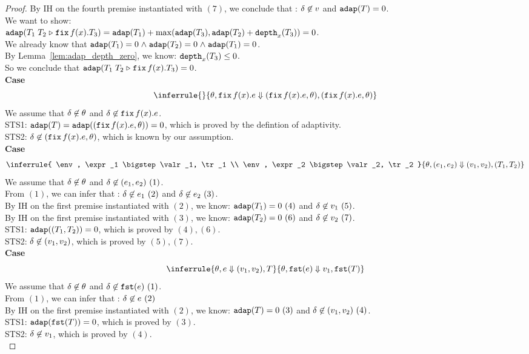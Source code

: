 \begin{proof}
By IH on the fourth premise instantiated with $(7)$, we conclude that
:
$\delta \not\in v $ and $\mathtt{adap}(T) = 0$. \\

We want to show: \\
 $ \mathtt{adap}(T_1 \; T_2 \mathrel{\triangleright} {\mathop{\mathtt{fix}} f(x).T_3})  = 
      \mathtt{adap}(T_1) + \max (\mathtt{adap}(T_3), \mathtt{adap}(T_2) +
      \mathtt{depth}_{x}(T_3)) = 0$. \\
We already know that $ \mathtt{adap}(T_1) =0 \mathrel{\wedge}\mathtt{adap}(T_2) =0  \mathrel{\wedge}
\mathtt{adap}(T_1) =0 $. \\
By Lemma~\ref{lem:adap_depth_zero}, we know: $\mathtt{depth}_{x}(T_3) \leq 0$.\\
So we conclude that $\mathtt{adap}(T_1 \; T_2 \mathrel{\triangleright} {\mathop{\mathtt{fix}} f(x).T_3}) =0$.\\
%
\textbf{Case}
\[\inferrule{
  }{
    \env, \efix f(x). \expr \bigstep (\efix f(x).\expr, \env),
    (\trfix f(x).\expr, \env)
  }\]
We assume that $\delta \not\in \theta$ and $\delta \not\in \mathop{\mathtt{fix}}
f(x). e$.\\
STS1: $\mathtt{adap}(T) = \mathtt{adap}( (\mathop{\mathtt{fix}} f(x).e, \theta) ) = 0$, which is
proved by the defintion of adaptivity. \\
STS2: $\delta \not\in (\mathop{\mathtt{fix}} f(x).e, \theta)$,  which is known by
our assumption. \\
%
\textbf{Case}
\[
\inferrule{
    \env, \expr_1 \bigstep \valr_1, \tr_1 \\
    \env, \expr_2 \bigstep \valr_2, \tr_2
  }{
    \env, (\expr_1, \expr_2) \bigstep (\valr_1, \valr_2), (\tr_1, \tr_2)
  }
\]
We assume that $\delta \not\in \theta$ and $\delta \not\in  (e_1, e_2)~(1) $.\\
From $(1)$, we can infer that : $\delta \not\in e_1~(2)$ and $\delta
\not\in e_2~(3)$.\\
By IH on the first premise instantiated with $(2)$, we know:
$\mathtt{adap}(T_1) = 0~(4)$ and $\delta \not\in v_1~(5) $. \\
By IH on the first premise instantiated with $(3)$, we know:
$\mathtt{adap}(T_2) = 0~(6)$ and $\delta \not\in v_2~(7)$. \\
STS1: $\mathtt{adap}((T_1,T_2)) = 0$, which is proved by $(4),(6)$.\\
STS2: $\delta \not\in (v_1,v_2) $, which is proved by
$(5),(7)$.\\

%
\textbf{Case}
\[
\inferrule{
    \env, \expr \bigstep (\valr_1, \valr_2), \tr
  }{
    \env, \eprojl(\expr) \bigstep \valr_1, \trprojl(\tr)
  }
\]
We assume that $\delta \not\in \theta$ and $\delta \not\in
\mathtt{fst}(e) ~(1) $.\\
From $(1)$, we can infer that : $\delta \not\in e~(2)$ \\
 By IH on the first premise instantiated with $(2)$, we know:
$\mathtt{adap}(T) = 0~(3)$ and $\delta \not\in (v_1, v_2) ~(4) $. \\
STS1: $\mathtt{adap}(\mathtt{fst}(T) ) = 0$, which is proved by $(3)$.\\
STS2: $\delta \not\in v_1 $, which is proved by $(4)$. \\


\end{proof}
